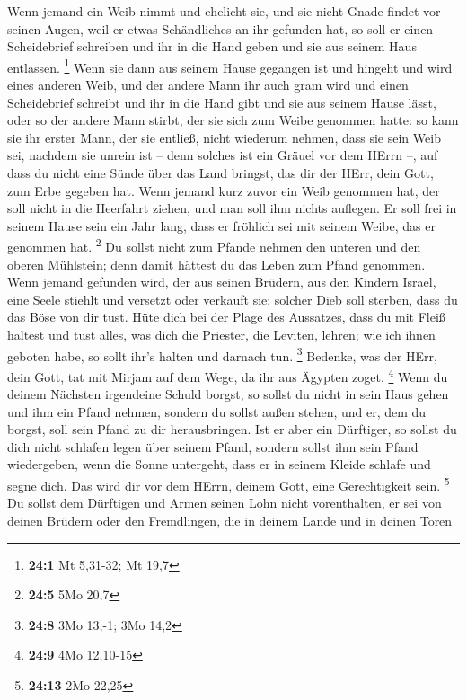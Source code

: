  Wenn jemand ein Weib nimmt und ehelicht sie, und sie
nicht Gnade findet vor seinen Augen, weil er etwas Schändliches an ihr
gefunden hat, so soll er einen Scheidebrief schreiben und ihr in die
Hand geben und sie aus seinem Haus entlassen. \footnote{\textbf{24:1} Mt
  5,31-32; Mt 19,7}  Wenn sie dann aus seinem Hause
gegangen ist und hingeht und wird eines anderen Weib,  und
der andere Mann ihr auch gram wird und einen Scheidebrief schreibt und
ihr in die Hand gibt und sie aus seinem Hause lässt, oder so der andere
Mann stirbt, der sie sich zum Weibe genommen hatte:  so
kann sie ihr erster Mann, der sie entließ, nicht wiederum nehmen, dass
sie sein Weib sei, nachdem sie unrein ist -- denn solches ist ein Gräuel
vor dem HErrn --, auf dass du nicht eine Sünde über das Land bringst,
das dir der HErr, dein Gott, zum Erbe gegeben hat.  Wenn
jemand kurz zuvor ein Weib genommen hat, der soll nicht in die Heerfahrt
ziehen, und man soll ihm nichts auflegen. Er soll frei in seinem Hause
sein ein Jahr lang, dass er fröhlich sei mit seinem Weibe, das er
genommen hat. \footnote{\textbf{24:5} 5Mo 20,7}  Du sollst
nicht zum Pfande nehmen den unteren und den oberen Mühlstein; denn damit
hättest du das Leben zum Pfand genommen.  Wenn jemand
gefunden wird, der aus seinen Brüdern, aus den Kindern Israel, eine
Seele stiehlt und versetzt oder verkauft sie: solcher Dieb soll sterben,
dass du das Böse von dir tust.  Hüte dich bei der Plage
des Aussatzes, dass du mit Fleiß haltest und tust alles, was dich die
Priester, die Leviten, lehren; wie ich ihnen geboten habe, so sollt
ihr's halten und darnach tun. \footnote{\textbf{24:8} 3Mo 13,-1; 3Mo
  14,2}  Bedenke, was der HErr, dein Gott, tat mit Mirjam
auf dem Wege, da ihr aus Ägypten zoget. \footnote{\textbf{24:9} 4Mo
  12,10-15}  Wenn du deinem Nächsten irgendeine Schuld
borgst, so sollst du nicht in sein Haus gehen und ihm ein Pfand nehmen,
 sondern du sollst außen stehen, und er, dem du borgst,
soll sein Pfand zu dir herausbringen.  Ist er aber ein
Dürftiger, so sollst du dich nicht schlafen legen über seinem Pfand,
 sondern sollst ihm sein Pfand wiedergeben, wenn die
Sonne untergeht, dass er in seinem Kleide schlafe und segne dich. Das
wird dir vor dem HErrn, deinem Gott, eine Gerechtigkeit sein.
\footnote{\textbf{24:13} 2Mo 22,25}  Du sollst dem
Dürftigen und Armen seinen Lohn nicht vorenthalten, er sei von deinen
Brüdern oder den Fremdlingen, die in deinem Lande und in deinen Toren

